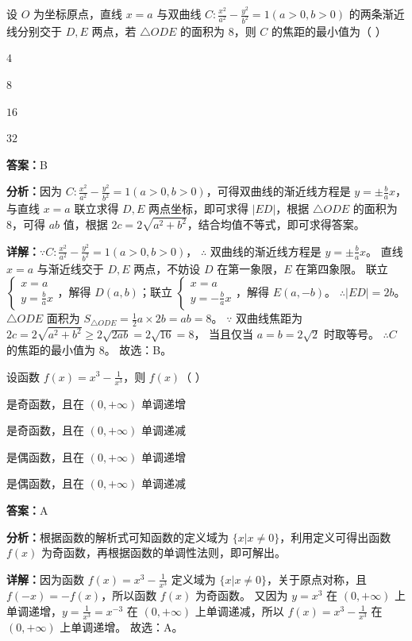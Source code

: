 \begin{question}[points=5]
设 $O$ 为坐标原点，直线 $x=a$ 与双曲线 $C:\frac{x^2}{a^2}-\frac{y^2}{b^2}=1(a>0,b>0)$ 的两条渐近线分别交于 $D, E$ 两点，若 $\triangle ODE$ 的面积为 $8$，则 $C$ 的焦距的最小值为（ ）
\begin{choices}
  \item $4$
  \item $8$
  \item $16$
  \item $32$
\end{choices}
\begin{solution}
\textbf{答案：}B

\textbf{分析：}因为 $C:\frac{x^2}{a^2}-\frac{y^2}{b^2}=1(a>0,b>0)$，可得双曲线的渐近线方程是 $y=\pm\frac{b}{a}x$，与直线 $x=a$ 联立求得 $D, E$ 两点坐标，即可求得 $|ED|$，根据 $\triangle ODE$ 的面积为 $8$，可得 $ab$ 值，根据 $2c=2\sqrt{a^2+b^2}$，结合均值不等式，即可求得答案。

\textbf{详解：}$\because C: \frac{x^2}{a^2}-\frac{y^2}{b^2}=1(a>0,b>0)$，
$\therefore$ 双曲线的渐近线方程是 $y=\pm\frac{b}{a}x$。
直线 $x=a$ 与渐近线交于 $D, E$ 两点，不妨设 $D$ 在第一象限，$E$ 在第四象限。
联立 $\begin{cases} x=a \\ y=\frac{b}{a}x \end{cases}$，解得 $D(a,b)$；联立 $\begin{cases} x=a \\ y=-\frac{b}{a}x \end{cases}$，解得 $E(a,-b)$。
$\therefore |ED|=2b$。
$\triangle ODE$ 面积为 $S_{\triangle ODE} = \frac{1}{2} a \times 2b = ab = 8$。
$\because$ 双曲线焦距为 $2c = 2\sqrt{a^2+b^2} \ge 2\sqrt{2ab} = 2\sqrt{16} = 8$，
当且仅当 $a=b=2\sqrt{2}$ 时取等号。
$\therefore C$ 的焦距的最小值为 $8$。
故选：B。
\end{solution}
\end{question}

\begin{question}[points=5]
设函数 $f(x)=x^3-\frac{1}{x^3}$，则 $f(x)$（ ）
\begin{choices}
  \item 是奇函数，且在 $(0,+\infty)$ 单调递增
  \item 是奇函数，且在 $(0,+\infty)$ 单调递减
  \item 是偶函数，且在 $(0,+\infty)$ 单调递增
  \item 是偶函数，且在 $(0,+\infty)$ 单调递减
\end{choices}
\begin{solution}
\textbf{答案：}A

\textbf{分析：}根据函数的解析式可知函数的定义域为 $\{x|x\neq0\}$，利用定义可得出函数 $f(x)$ 为奇函数，再根据函数的单调性法则，即可解出。

\textbf{详解：}因为函数 $f(x)=x^3-\frac{1}{x^3}$ 定义域为 $\{x|x\neq0\}$，关于原点对称，且 $f(-x) = -f(x)$，所以函数 $f(x)$ 为奇函数。
又因为 $y=x^3$ 在 $(0,+\infty)$ 上单调递增，$y=\frac{1}{x^3}=x^{-3}$ 在 $(0,+\infty)$ 上单调递减，所以 $f(x)=x^3-\frac{1}{x^3}$ 在 $(0,+\infty)$ 上单调递增。
故选：A。
\end{solution}
\end{question}

